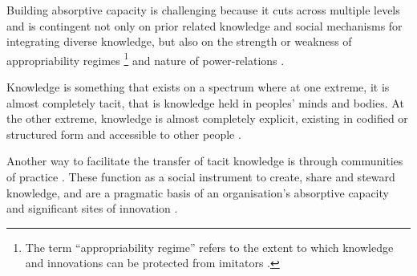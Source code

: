 Building absorptive capacity is challenging because it cuts across multiple levels and is contingent not only on prior related knowledge and social mechanisms for integrating diverse knowledge, but also on the strength or weakness of appropriability regimes \footnote{The term \enquote{appropriability regime} refers to the extent to which knowledge and innovations can be protected from imitators \citep{teece1998capturing,hurmelinna2007nature}.} and nature of power-relations \citep{todorova2007absorptive,easterby2008absorptive,duchek2013capturing}. \medskip 

Knowledge is something that exists on a spectrum where at one extreme, it is almost completely tacit, that is knowledge held in peoples' minds and bodies. At the other extreme, knowledge is almost completely explicit, existing in codified or structured form and accessible to other people \citep{polanyi1966tacit,inkpen1998knowledge,leonard1998role,cavusgil2003tacit}.  

Another way to facilitate the transfer of tacit knowledge is through communities of practice \citep{lave1991situated,brown2001knowledge,smith2001role,cox2005communities,easterby2008inter}. These function as a social instrument to create, share and steward knowledge, and are a pragmatic basis of an organisation’s absorptive capacity and significant sites of innovation \citep{brown1991organizational}. \medskip





 



